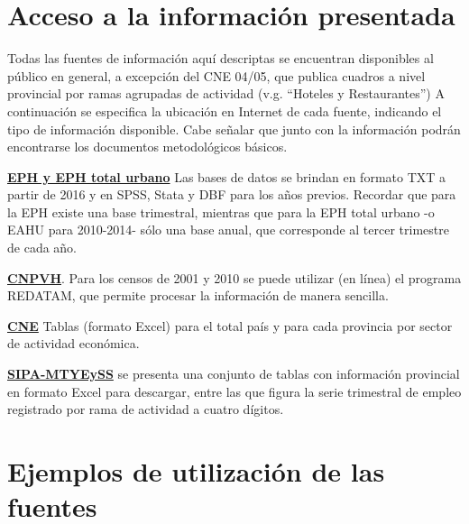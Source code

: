 \documentclass[
  openany]{book}
\begin{document}
\hypertarget{acceso-a-la-informaciuxf3n-presentada}{%
\section{Acceso a la información presentada}\label{acceso-a-la-informaciuxf3n-presentada}}

Todas las fuentes de información aquí descriptas se encuentran disponibles al público en general, a excepción del CNE 04/05, que publica cuadros a nivel provincial por ramas agrupadas de actividad (v.g. ``Hoteles y Restaurantes'')
A continuación se especifica la ubicación en Internet de cada fuente, indicando el tipo de información disponible.
Cabe señalar que junto con la información podrán encontrarse los documentos metodológicos básicos.

\href{https://www.indec.gob.ar/indec/web/Institucional-Indec-BasesDeDatos-1}{\textbf{EPH y EPH total urbano}} Las bases de datos se brindan en formato TXT a partir de 2016 y en SPSS, Stata y DBF para los años previos.
Recordar que para la EPH existe una base trimestral, mientras que para la EPH total urbano -o EAHU para 2010-2014- sólo una base anual, que corresponde al tercer trimestre de cada año.

\href{https://www.indec.gob.ar/indec/web/Nivel3-Tema-2-41}{\textbf{CNPVH}}. Para los censos de 2001 y 2010 se puede utilizar (en línea) el programa REDATAM, que permite procesar la información de manera sencilla.

\href{https://sitioanterior.indec.gob.ar/cne2005_index.asp}{\textbf{CNE}} Tablas (formato Excel) para el total país y para cada provincia por sector de actividad económica.

\href{https://www.trabajo.gob.ar/estadisticas/oede/estadisticasregionales.asp}{\textbf{SIPA-MTYEySS}} se presenta una conjunto de tablas con información provincial en formato Excel para descargar, entre las que figura la serie trimestral de empleo registrado por rama de actividad a cuatro dígitos.

\hypertarget{ejemplos-de-utilizaciuxf3n-de-las-fuentes}{%
\section{Ejemplos de utilización de las fuentes}\label{ejemplos-de-utilizaciuxf3n-de-las-fuentes}}
\end{document}
